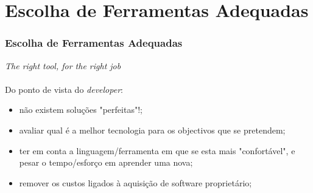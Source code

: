 \documentclass[hyperref={pdfpagelabels=true}]{beamer}
\begin{document}
\section{Escolha de Ferramentas Adequadas} 
\begin{frame}
\frametitle{Escolha de Ferramentas Adequadas}

\textit{The right tool, for the right job}\\~\\

Do ponto de vista do \textit{developer}:
    \begin{itemize}
      \item<2-> n\~{a}o existem solu\c{c}\~{o}es "perfeitas"!;%
      \item<3-> avaliar qual \'{e} a melhor tecnologia para os objectivos que se pretendem;%
      \item<4-> ter em conta a linguagem/ferramenta em que se esta mais "confort\'{a}vel", e pesar o tempo/esfor\c{c}o em aprender uma nova;%
      \item<5-> remover os custos ligados \`{a} aquisi\c{c}\~{a}o de software propriet\'{a}rio;%
      \end{itemize}
\end{frame}
\end{document}
